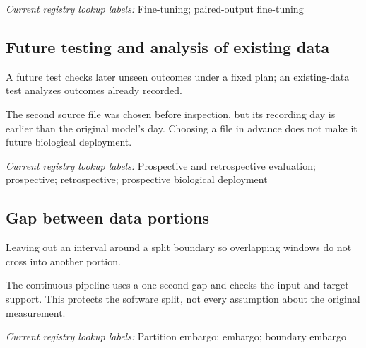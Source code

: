 \noindent\textit{Current registry lookup labels:} Fine-tuning; paired-output fine-tuning\par

\begin{samepage}
\subsection*{Future testing and analysis of existing data}
\noindent A future test checks later unseen outcomes under a fixed plan; an existing-data test analyzes outcomes already recorded.\par
\end{samepage}
\begin{samepage}
\noindent The second source file was chosen before inspection, but its recording day is earlier than the original model’s day. Choosing a file in advance does not make it future biological deployment.\par\nopagebreak[4]

\end{samepage}


\noindent\textit{Current registry lookup labels:} Prospective and retrospective evaluation; prospective; retrospective; prospective biological deployment\par

\begin{samepage}
\subsection*{Gap between data portions}
\noindent Leaving out an interval around a split boundary so overlapping windows do not cross into another portion.\par
\end{samepage}
\begin{samepage}
\noindent The continuous pipeline uses a one-second gap and checks the input and target support. This protects the software split, not every assumption about the original measurement.\par\nopagebreak[4]

\end{samepage}


\noindent\textit{Current registry lookup labels:} Partition embargo; embargo; boundary embargo\par

